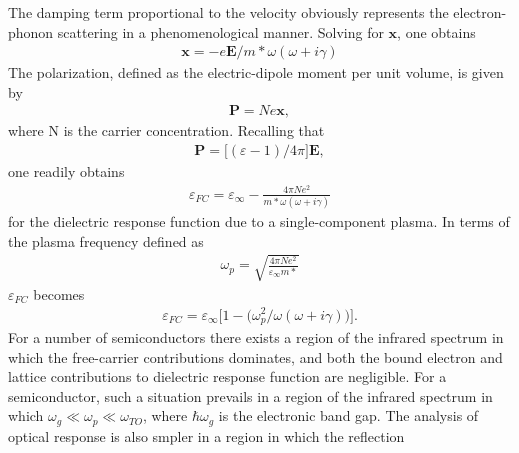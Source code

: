 The damping term proportional to the velocity obviously represents the electron-phonon scattering in 
a phenomenological manner. Solving for $\boldsymbol x$, one obtains
\begin{align}
   \boldsymbol x = -e \boldsymbol E /m* \omega (\omega + i \gamma)
\end{align}
The polarization, defined as the electric-dipole moment per unit volume, is given by
\begin{align}
   \boldsymbol P = Ne \boldsymbol x,
\end{align}
where N is the carrier concentration. Recalling that 
\begin{align}
   \boldsymbol P =  \big[ (\varepsilon - 1)/ 4\pi \big] \boldsymbol E,
\end{align}
one readily obtains
\begin{align}
   \varepsilon_{FC} = \varepsilon_{\infty} - \frac{4 \pi N e^2}{m*\omega(\omega + i \gamma)}
\end{align}
for the dielectric response function due to a single-component plasma. In terms of the plasma frequency
defined as 
\begin{align}
   \omega_p = \sqrt{\frac{4\pi N e^2}{\varepsilon_{\infty} m*}}
\end{align}
$\varepsilon_{FC}$ becomes
\begin{align}
   \varepsilon_{FC} = \varepsilon_{\infty} \big[ 1 - \big(\omega_p^2/\omega(\omega + i \gamma)\big)\big].
\end{align}
For a number of semiconductors there exists a region of the infrared spectrum in which the free-carrier 
contributions dominates, and both the bound electron and lattice contributions to dielectric response
function are negligible. For a semiconductor, such a situation prevails in a region of the infrared
spectrum in which $\omega_g \ll \omega_p \ll \omega_{TO}$, where $\hbar \omega_g$ is the
electronic band gap. The analysis of optical response is also smpler in a region in which the reflection


\begin{thebibliography}{9}
\end{thebibliography}
